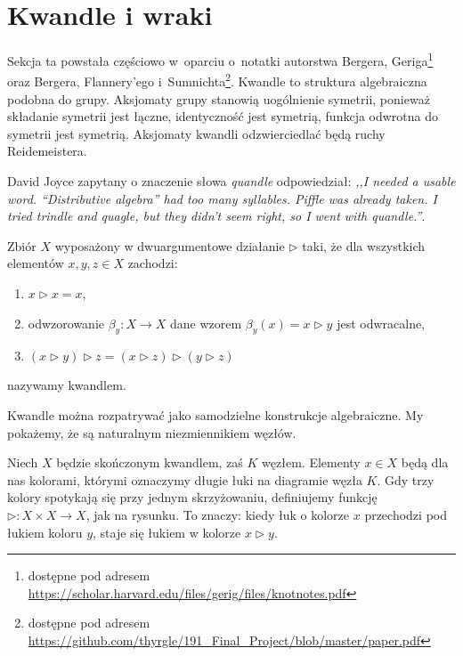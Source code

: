 
\section{Kwandle i wraki}

Sekcja ta powstała częściowo w~oparciu o~notatki autorstwa Bergera, Geriga\footnote{dostępne pod adresem \url{https://scholar.harvard.edu/files/gerig/files/knotnotes.pdf}} oraz Bergera, Flannery'ego i~Sumnichta\footnote{dostępne pod adresem \url{https://github.com/thyrgle/191_Final_Project/blob/master/paper.pdf}}.
Kwandle to struktura algebraiczna podobna do grupy.
Aksjomaty grupy stanowią uogólnienie symetrii, ponieważ składanie symetrii jest łączne, identyczność jest symetrią, funkcja odwrotna do symetrii jest symetrią.
Aksjomaty kwandli odzwierciedlać będą ruchy Reidemeistera.
%

David Joyce zapytany o znaczenie słowa \emph{quandle} odpowiedział: \emph{,,I needed a usable word. “Distributive algebra” had too many syllables. Piffle was already taken. I tried trindle and quagle, but they didn’t seem right, so I went with quandle.''}.

\begin{definition}[kwandl]
    Zbiór $X$ wyposażony w dwuargumentowe działanie $\triangleright$ taki, że dla wszystkich elementów $x, y, z \in X$ zachodzi:
    \begin{enumerate}
        \item $x \triangleright x = x$,
        \item odwzorowanie $\beta_y \colon X \to X$ dane wzorem $\beta_y(x) = x \triangleright y$ jest odwracalne,
        \item $(x \triangleright y) \triangleright z = (x \triangleright z) \triangleright (y \triangleright z)$
    \end{enumerate}
    nazywamy kwandlem.
\end{definition}

Kwandle można rozpatrywać jako samodzielne konstrukcje algebraiczne.
My pokażemy, że są naturalnym niezmiennikiem węzłów.

Niech $X$ będzie skończonym kwandlem, zaś $K$ węzłem.
Elementy $x \in X$ będą dla nas kolorami, którymi oznaczymy długie łuki na diagramie węzła $K$.
Gdy trzy kolory spotykają się przy jednym skrzyżowaniu, definiujemy funkcję $\triangleright \colon X \times X \to X$, jak na rysunku.
To znaczy: kiedy łuk o kolorze $x$ przechodzi pod łukiem koloru $y$, staje się łukiem w kolorze $x \triangleright y$.
\begin{comment}
\[
    \LargeMinusCrossingQuandle
\]
\end{comment}

